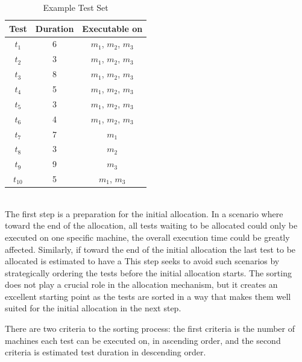 \begin{table}[h!]
  \begin{tabular}{c c c}
    \hline
    \textbf{Test} & \textbf{Duration} & \textbf{Executable on}\\
    \hline
    $t_{1}$     &   6   &   $m_{1}$, $m_{2}$, $m_{3}$\\
    $t_{2}$     &   3   &   $m_{1}$, $m_{2}$, $m_{3}$\\
    $t_{3}$     &   8   &   $m_{1}$, $m_{2}$, $m_{3}$\\
    $t_{4}$     &   5   &   $m_{1}$, $m_{2}$, $m_{3}$\\
    $t_{5}$     &   3   &   $m_{1}$, $m_{2}$, $m_{3}$\\
    $t_{6}$     &   4   &   $m_{1}$, $m_{2}$, $m_{3}$\\
    $t_{7}$     &   7   &   $m_{1}$\\
    $t_{8}$     &   3   &   $m_{2}$\\
    $t_{9}$     &   9   &   $m_{3}$\\
    $t_{10}$    &   5   &   $m_{1}$, $m_{3}$\\
    \hline
  \end{tabular}
  \centering
  \caption{Example Test Set}
  \label{testsuite}
\end{table}


\noindent \textbf{}\\
\noindent The first step is a preparation for the initial allocation. In a scenario where toward the end of the allocation, all tests waiting to be allocated could only be executed on one specific machine, the overall execution time could be greatly affected. Similarly, if toward the end of the initial allocation the last test to be allocated is estimated to have a  This step seeks to avoid such scenarios by strategically ordering the tests before the initial allocation starts. The sorting does not play a crucial role in the allocation mechanism, but it creates an excellent starting point as the tests are sorted in a way that makes them well suited for the initial allocation in the next step.

There are two criteria to the sorting process: the first criteria is the number of machines each test can be executed on, in ascending order, and the second criteria is estimated test duration in descending order.

